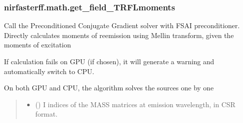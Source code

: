 \documentclass[letterpaper,10pt,english]{sphinxmanual}
\begin{document}
\sphinxstepscope


\subsubsection{nirfasterff.math.get\_field\_TRFLmoments}
\label{\detokenize{_autosummary/nirfasterff.math.get_field_TRFLmoments:nirfasterff-math-get-field-trflmoments}}\label{\detokenize{_autosummary/nirfasterff.math.get_field_TRFLmoments::doc}}

\begin{fulllineitems}
\label{\detokenize{_autosummary/nirfasterff.math.get_field_TRFLmoments:nirfasterff.math.get_field_TRFLmoments}}
\pysigstartsignatures
\pysiglinewithargsret
{}
{\sphinxparamcomma {}\sphinxparamcomma {}\sphinxparamcomma {}\sphinxparamcomma {}\sphinxparamcomma {}\sphinxparamcomma {}\sphinxparamcomma {}\sphinxparamcomma {}\sphinxparamcomma {}}
{}
\pysigstopsignatures
\sphinxAtStartPar
Call the Preconditioned Conjugate Gradient solver with FSAI preconditioner. Directly calculates moments of re\sphinxhyphen{}emission using Mellin transform, given the moments of excitation

\sphinxAtStartPar
If calculation fails on GPU (if chosen), it will generate a warning and automatically switch to CPU.

\sphinxAtStartPar
On both GPU and CPU, the algorithm solves the sources one by one
\begin{quote}\begin{description}
\begin{itemize}
\item {} 
\sphinxAtStartPar
{} (\sphinxstyleliteralemphasis{\sphinxupquote{, }}) \textendash{} I indices of the MASS matrices at emission wavelength, in CSR format.


\end{itemize}
\end{description}
\end{quote}
\end{fulllineitems}
\end{document}
